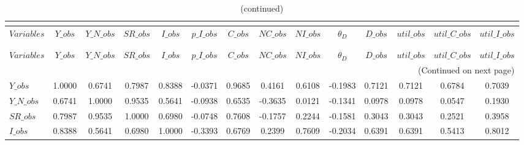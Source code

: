  
\begin{center}
\begin{longtable}{lccccccccccccc} 
\caption{MATRIX OF CORRELATIONS}\\
 \label{Table:th_corr_matrix}\\
\toprule 
$Variables     $	 & 	 $         Y\_obs$	 & 	 $     Y\_N\_obs$	 & 	 $        SR\_obs$	 & 	 $         I\_obs$	 & 	 $     p\_I\_obs$	 & 	 $         C\_obs$	 & 	 $        NC\_obs$	 & 	 $        NI\_obs$	 & 	 $     {\theta_D}$	 & 	 $         D\_obs$	 & 	 $      util\_obs$	 & 	 $  util\_C\_obs$	 & 	 $  util\_I\_obs$\\
\midrule \endfirsthead 
\caption{(continued)}\\
 \toprule \\ 
$Variables     $	 & 	 $         Y\_obs$	 & 	 $     Y\_N\_obs$	 & 	 $        SR\_obs$	 & 	 $         I\_obs$	 & 	 $     p\_I\_obs$	 & 	 $         C\_obs$	 & 	 $        NC\_obs$	 & 	 $        NI\_obs$	 & 	 $     {\theta_D}$	 & 	 $         D\_obs$	 & 	 $      util\_obs$	 & 	 $  util\_C\_obs$	 & 	 $  util\_I\_obs$\\
\midrule \endhead 
\midrule \multicolumn{14}{r}{(Continued on next page)} \\ \bottomrule \endfoot 
\bottomrule \endlastfoot 
$Y\_obs        $	 & 	          1.0000	 & 	          0.6741	 & 	          0.7987	 & 	          0.8388	 & 	         -0.0371	 & 	          0.9685	 & 	          0.4161	 & 	          0.6108	 & 	         -0.1983	 & 	          0.7121	 & 	          0.7121	 & 	          0.6784	 & 	          0.7039 \\ 
$Y\_N\_obs     $	 & 	          0.6741	 & 	          1.0000	 & 	          0.9535	 & 	          0.5641	 & 	         -0.0938	 & 	          0.6535	 & 	         -0.3635	 & 	          0.0121	 & 	         -0.1341	 & 	          0.0978	 & 	          0.0978	 & 	          0.0547	 & 	          0.1930 \\ 
$SR\_obs       $	 & 	          0.7987	 & 	          0.9535	 & 	          1.0000	 & 	          0.6980	 & 	         -0.0748	 & 	          0.7608	 & 	         -0.1757	 & 	          0.2244	 & 	         -0.1581	 & 	          0.3043	 & 	          0.3043	 & 	          0.2521	 & 	          0.3958 \\ 
$I\_obs        $	 & 	          0.8388	 & 	          0.5641	 & 	          0.6980	 & 	          1.0000	 & 	         -0.3393	 & 	          0.6769	 & 	          0.2399	 & 	          0.7609	 & 	         -0.2034	 & 	          0.6391	 & 	          0.6391	 & 	          0.5413	 & 	          0.8012 \\ 

\end{longtable}
\end{center}
